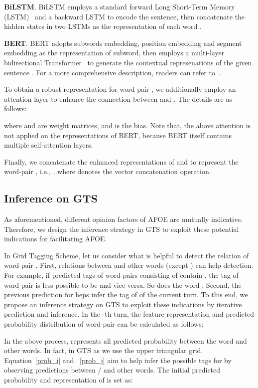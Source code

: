 \documentclass[11pt,a4paper]{article}
\begin{document}
\textbf{BiLSTM}. BiLSTM employs a standard forward Long Short-Term Memory (LSTM)~\cite{DBLP:journals/neco/HochreiterS97} and a backward LSTM to encode the sentence, then concatenate the hidden states in two LSTMs as the representation  of each word .

\textbf{BERT}. BERT adopts subwords embedding, position embedding and segment embedding as the representation of subword, then employs a multi-layer bidirectional Transformer~\cite{DBLP:conf/nips/VaswaniSPUJGKP17} to generate the contextual represenations  of the given sentence . For a more comprehensive description, readers can refer to~.

To obtain a robust representation for word-pair , we additionally employ an attention layer to enhance the connection between  and . The details are as follows:

where  and  are weight matrices, and  is the bias. Note that, the above attention is not applied on the representations of BERT, because BERT itself contains multiple self-attention layers.

Finally, we concatenate the enhanced representations of  and  to represent the word-pair , i.e., , where  denotes the vector concatenation operation.

\subsection{Inference on GTS}
\label{inferenceongts}
As aforementioned, different opinion factors of AFOE are mutually indicative. Therefore, we design the inference strategy in GTS to exploit these potential indications for facilitating AFOE.

In Grid Tagging Scheme, let us consider what is helpful to detect the relation of word-pair . First, relations between  and other words (except ) can help detection. For example, if predicted tags of word-pairs consisting of  contain , the tag of word-pair  is less possible to be  and vice versa. So does the word . Second, the previous prediction for  heps infer the tag of  of the current turn. To this end, we propose an inference strategy on GTS to exploit these indications by iterative prediction and inference. In the -th turn, the feature representation  and predicted probability distribution  of word-pair  can be calculated as follows:


In the above process,  represents all predicted probability between the word  and other words. In fact,  in GTS as we use the upper triangular grid. Equation~\ref{prob_i} and ~\ref{prob_j} aim to help infer the possible tags for  by observing predictions between / and other words. The initial predicted probability  and representation  of  is set as:
\end{document}
